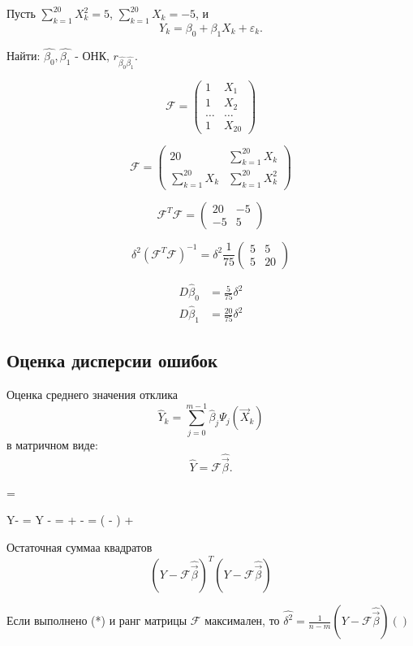 \begin{ex}
  Пусть $\sum_{k=1}^20 X_k^2 = 5$, $\sum_{k=1}^20 X_k= -5$, и
  \[
    Y_k = \beta_0 + \beta_1 X_k + \varepsilon_k.
  \]

  Найти: $\hat{\beta_0}, \hat{\beta_1}$ - ОНК, $r_{\hat{\beta_0} \hat{\beta_1}}$.

  \[
    \mathcal{F} = \begin{pmatrix}
      1 & X_1 \\
      1 & X_2 \\
      \dots & \dots \\
      1 & X_{20}
    \end{pmatrix}
  \]

  \[
    \mathcal{F} = \begin{pmatrix}
      20 & \sum_{k=1}^{20} X_k \\
      \sum_{k=1}^{20} X_k & \sum_{k=1}^{20} X_k^2
    \end{pmatrix}
  \]

  \[
    \mathcal{F}^T \mathcal{F} = \begin{pmatrix}
      20 & -5 \\
      -5 & 5
    \end{pmatrix}
  \]
  
  \[
    \delta^2 (\mathcal{F}^T \mathcal{F})^{-1} = \delta^2 \frac{1}{75} \begin{pmatrix}
      5 & 5 \\
      5 & 20
    \end{pmatrix}
  \]

  \begin{align*}
    D \hat{\beta}_0 &= \frac{5}{75} \delta^2 \\
    D \hat{\beta}_1 &= \frac{20}{75} \delta^2
  \end{align*}
\end{ex}

\subsection{Оценка дисперсии ошибок}

\begin{definition}
  Оценка среднего значения отклика
  \[
    \hat{Y}_k = \sum_{j=0}^{m-1} \hat{\beta}_j \Psi_j(\vec{X}_k)
  \]
  в матричном виде:
  \[
    \hat{Y} = \mathcal{F} \hat{\vec{\beta}}.
  \]

   =  \hat{\vec{\beta}}

  Y- = Y -  \hat{\vec{\beta}}
  =  \vec{\beta} + \varepsilon - \hat{\vec{\beta}}
  =  (\vec{\beta} - \hat{\vec{\beta}}) + \varepsilon

  Остаточная суммаа квадратов
  \[
    (Y - \mathcal{F} \hat{\vec{\beta}})^T (Y-\mathcal{F}\hat{\vec{\beta}})
  \]
\end{definition}

\begin{theorem}
  Если выполнено (*) и ранг матрицы $\mathcal{F}$ максимален, то $\hat{\delta^2} = \frac{1}{n-m} (Y-\mathcal{F}\hat{\vec{\beta}})()$
\end{theorem}
